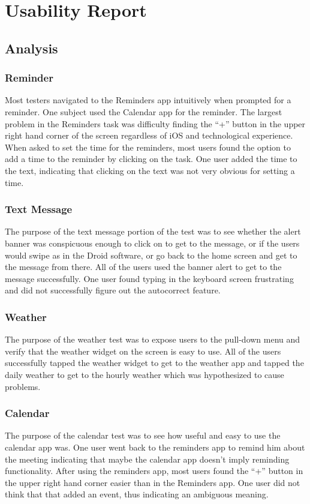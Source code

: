 \section{Usability Report}
\subsection{Analysis}
\subsubsection{Reminder}
Most testers navigated to the Reminders app intuitively when prompted for a reminder.  One subject used the Calendar app for the reminder.  The largest problem in the Reminders task was difficulty finding the ``+'' button in the upper right hand corner of the screen regardless of iOS and technological experience.
When asked to set the time for the reminders, most users found the option to add a time to the reminder by clicking on the task.  One user added the time to the text, indicating that clicking on the text was not very obvious for setting a time.
\subsubsection{Text Message}
The purpose of the text message portion of the test was to see whether the alert banner was conspicuous enough to click on to get to the message, or if the users would swipe as in the Droid software, or go back to the home screen and get to the message from there.
All of the users used the banner alert to get to the message successfully.  One user found typing in the keyboard screen frustrating and did not successfully figure out the autocorrect feature.
\subsubsection{Weather}
The purpose of the weather test was to expose users to the pull-down menu and verify that the weather widget on the screen is easy to use.  All of the users successfully tapped the weather widget to get to the weather app and tapped the daily weather to get to the hourly weather which was hypothesized to cause problems.
\subsubsection{Calendar}
The purpose of the calendar test was to see how useful and easy to use the calendar app was.  One user went back to the reminders app to remind him about the meeting indicating that maybe the calendar app doesn't imply reminding functionality.  After using the reminders app, most users found the ``+'' button in the upper right hand corner easier than in the Reminders app.  One user did not think that that added an event, thus indicating an ambiguous meaning.

